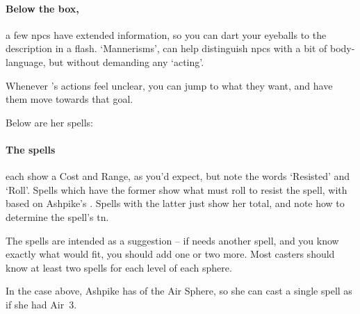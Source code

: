 \begin{multicols}{2}
\paragraph{Below the box,}
a few \glspl{npc} have extended information, so you can dart your eyeballs to the description in a flash.
`Mannerisms', can help distinguish \glspl{npc} with a bit of body-language, but without demanding any `acting'.

Whenever 's actions feel unclear, you can jump to what they want, and have them move towards that goal.

Below are her spells:

\begin{boxtext}
\setcounter{diceNo}{0}
\showStdSpells
\end{boxtext}

\paragraph{The spells}
each show a Cost and Range, as you'd expect, but note the words `Resisted' and `Roll'.
Spells which have the former show what  must roll to resist the spell, with  based on Ashpike's .
Spells with the latter just show her  total, and note how to determine the spell's \gls{tn}.

The spells are intended as a suggestion -- if  needs another spell, and you know exactly what would fit, you should add one or two more.
Most casters should know at least two spells for each level of each sphere.

In the case above, Ashpike has  of the Air Sphere, so she can cast a single spell as if she had Air~3.

\end{multicols}
